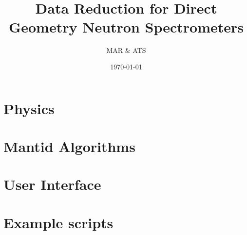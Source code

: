 \documentclass[11pt]{article}
\numberwithin{equation}{section}
\numberwithin{figure}{section}
\begin{document}
\title{Data Reduction for Direct Geometry Neutron Spectrometers}
\author{MAR \& ATS}
\date{\today}
\maketitle

\section{Physics}\label{sec:Physics}

\section{Mantid Algorithms}\label{sec:Algs}

\section{User Interface}\label{sec:UI}

\section{Example scripts}\label{sec:Examples}

\end{document}

